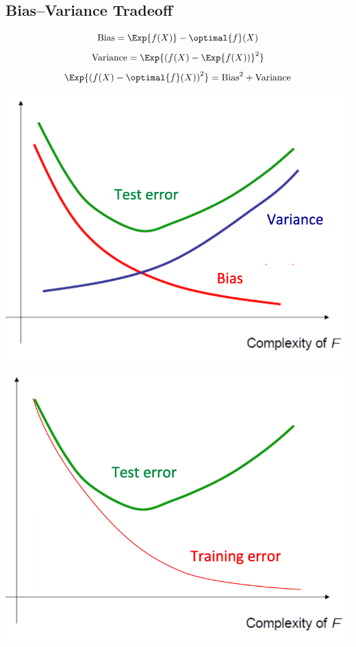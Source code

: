 \documentclass[18pt,a3paper,landscape, ncols=3]{cheatsheet}
\begin{document}
		\subsection{Bias--Variance Tradeoff}
			\begin{mdframed}
				\begin{minipage}{.33\textwidth}
					\[
						\mathrm{Bias} = \Exp{f(X)} - \optimal{f}(X)
					\]
					\[
						\mathrm{Variance} = \Exp{{(f(X) - \Exp{f(X))}^2}}
					\]
					\[
						\Exp{{(f(X) - \optimal{f}(X))}^2} = \mathrm{Bias}^2 + \mathrm{Variance}
					\]
				\end{minipage}%
				\begin{minipage}{.33\textwidth}
					\includegraphics{bias_vs_variance_error.png}
				\end{minipage}%
				\begin{minipage}{.33\textwidth}
					\includegraphics{test_vs_train_error.png}
				\end{minipage}
			\end{mdframed}
\end{document}
